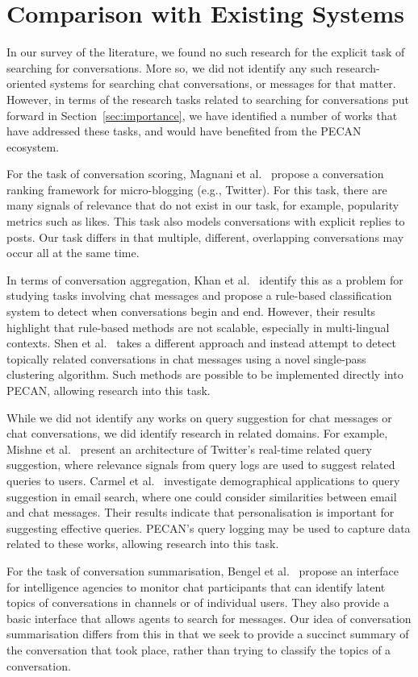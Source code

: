 \section{Comparison with Existing Systems}

In our survey of the literature, we found no such research for the explicit task of searching for conversations. More so, we did not identify any such research-oriented systems for searching chat conversations, or messages for that matter. However, in terms of the research tasks related to searching for conversations put forward in Section~\ref{sec:importance}, we have identified a number of works that have addressed these tasks, and would have benefited from the PECAN ecosystem.

For the task of conversation scoring, Magnani et al.~\cite{magnani2012conversation} propose a conversation ranking framework for micro-blogging (e.g., Twitter). For this task, there are many signals of relevance that do not exist in our task, for example, popularity metrics such as likes. This task also models conversations with explicit replies to posts. Our task differs in that multiple, different, overlapping conversations may occur all at the same time.

In terms of conversation aggregation, Khan et al.~\cite{khan2002mining} identify this as a problem for studying tasks involving chat messages and propose a rule-based classification system to detect when conversations begin and end. However, their results highlight that rule-based methods are not scalable, especially in multi-lingual contexts. Shen et al.~\cite{shen2006thread} takes a different approach and instead attempt to detect topically related conversations in chat messages using a novel single-pass clustering algorithm. Such methods are possible to be implemented directly into PECAN, allowing research into this task.

While we did not identify any works on query suggestion for chat messages or chat conversations, we did identify research in related domains. For example, Mishne et al.~\cite{mishne2013fast} present an architecture of Twitter's real-time related query suggestion, where relevance signals from query logs are used to suggest related queries to users. Carmel et al.~\cite{carmel2017demographics} investigate demographical applications to query suggestion in email search, where one could consider similarities between email and chat messages. Their results indicate that personalisation is important for suggesting effective queries. PECAN's query logging may be used to capture data related to these works, allowing research into this task.

For the task of conversation summarisation, Bengel et al.~\cite{bengel2004chattrack} propose an interface for intelligence agencies to monitor chat participants that can identify latent topics of conversations in channels or of individual users. They also provide a basic interface that allows agents to search for messages. Our idea of conversation summarisation differs from this in that we seek to provide a succinct summary of the conversation that took place, rather than trying to classify the topics of a conversation. 
